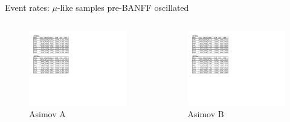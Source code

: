 \documentclass{beamer}
\begin{document}
\begin{frame}{Event rates: $\mu$-like samples pre-BANFF oscillated}
	\centering

	\begin{columns}
		\begin{column}{0.5\paperwidth}
			\begin{figure}
				\includegraphics[page=1, trim={0cm 9cm 13cm 1cm}, clip, scale=0.52] {images/rates/prefit_A}
				\caption*{Asimov A}
			\end{figure}
		\end{column}
		\begin{column}{0.5\paperwidth}
			\begin{figure}
				\includegraphics[page=1, trim={0cm 9cm 13cm 1cm}, clip, scale=0.52] {images/rates/prefit_B}
				\caption*{Asimov B}
			\end{figure}
		\end{column}
	\end{columns}
\end{frame}
\end{document}
